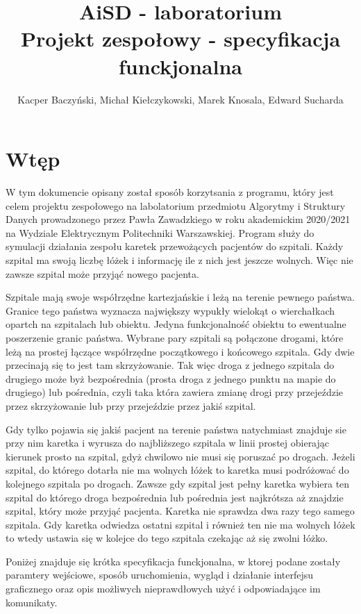 \documentclass[10pt,a4paper]{article}
\title{\huge AiSD - laboratorium \\ \Large Projekt zespołowy - specyfikacja funckjonalna}
\author{Kacper Baczyński, Michał Kiełczykowski, Marek Knosala, Edward Sucharda}
\begin{document}
\maketitle

\section{Wtęp}

W tym dokumencie opisany został sposób korzytsania z programu, który jest celem projektu zespołowego na labolatorium przedmiotu Algorytmy i Struktury Danych prowadzonego przez Pawła Zawadzkiego w roku akademickim 2020/2021 na Wydziale Elektrycznym Politechniki Warszawskiej. Program służy do symulacji działania zespołu karetek przewożących pacjentów do szpitali. Każdy szpital ma swoją liczbę łóżek i informację ile z nich jest jeszcze wolnych. Więc nie zawsze szpital może przyjąć nowego pacjenta.

Szpitale mają swoje współrzędne kartezjańskie i leżą na terenie pewnego państwa. Granice tego państwa wyznacza największy wypukły wielokąt o wierchałkach opartch na szpitalach lub obiektu. Jedyna funkcjonalność obiektu to ewentualne poszerzenie granic państwa. Wybrane pary szpitali są połączone drogami, które leżą na prostej łączące współrzędne początkowego i końcowego szpitala. Gdy dwie przecinają się to jest tam skrzyżowanie. Tak więc droga z jednego szpitala do drugiego może byż bezpośrednia (prosta droga z jednego punktu na mapie do drugiego) lub pośrednia, czyli taka która zawiera zmianę drogi przy przejeździe przez skrzyżowanie lub przy przejeździe przez jakiś szpital.

Gdy tylko pojawia się jakiś pacjent na terenie państwa natychmiast znajduje sie przy nim karetka i wyrusza do najbliższego szpitala w linii prostej obierając kierunek prosto na szpital, gdyż chwilowo nie musi się poruszać po drogach. Jeżeli szpital, do którego dotarła nie ma wolnych łóżek to karetka musi podróżować do kolejnego szpitala po drogach. Zawsze gdy szpital jest pełny karetka wybiera ten szpital do którego droga bezpośrednia lub pośrednia jest najkrótsza aż znajdzie szpital, który może przyjąć pacjenta. Karetka nie sprawdza dwa razy tego samego szpitala. Gdy karetka odwiedza ostatni szpital i również ten nie ma wolnych łóżek to wtedy ustawia się w kolejce do tego szpitala czekając aż się zwolni łóżko.

Poniżej znajduje się krótka specyfikacja funckjonalna, w ktorej podane zostały paramtery wejściowe, sposób uruchomienia, wygląd i działanie interfejsu graficznego oraz opis możliwych nieprawdłowych użyć i odpowiadające im komunikaty.
\end{document}
